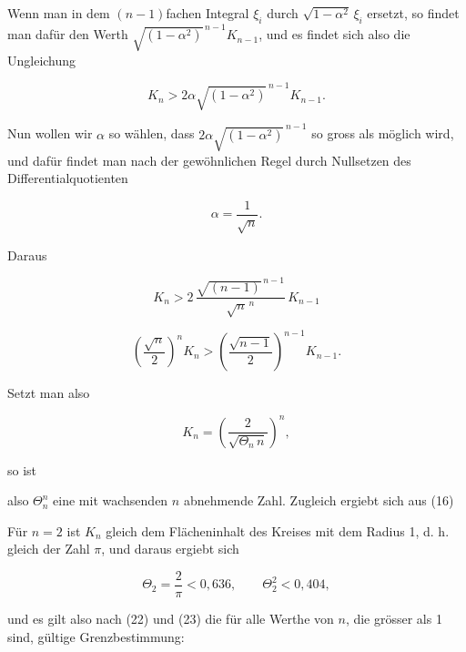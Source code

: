 Wenn man in dem $(n-1)$fachen Integral $\xi_i$ durch
$\sqrt{1-\alpha^2}\,\xi_i$ ersetzt, so findet man dafür den Werth
$\sqrt{(1-\alpha^2)}^{\,n-1} K_{n-1}$, und es findet sich also die
Ungleichung

\[
K_n > 2\alpha \sqrt{(1-\alpha^2)}^{\,n-1} K_{n-1}.
\]

Nun wollen wir $\alpha$ so wählen, dass $2\alpha
\sqrt{(1-\alpha^2)}^{\,n-1}$ so gross als möglich wird, und dafür
findet man nach der gewöhnlichen Regel durch Nullsetzen des
Differentialquotienten

\[
\alpha = \frac{1}{\sqrt{n}}.
\]

Daraus

\[
K_n > 2\, \frac{\sqrt{(n-1)}^{\,n-1}}{\sqrt{n}^{\,n}}\, K_{n-1}
\]

\[
\left(\frac{\sqrt{n}}{2}\right)^{n} K_n > \left(\frac{\sqrt{n-1}}{2}\right)^{n-1} K_{n-1}.
\]

Setzt man also

\[
K_n = \left(\frac{2}{\sqrt{\Theta_n\, n}}\right)^{n},
\]

so ist


also $\Theta_n^n$ eine mit wachsenden $n$ abnehmende Zahl. Zugleich
ergiebt sich aus (16)


Für $n = 2$ ist $K_n$ gleich dem Flächeninhalt des Kreises mit dem
Radius 1, d. h. gleich der  Zahl $\pi$, und
daraus ergiebt sich

\[
\Theta_2 = \frac{2}{\pi} < 0{,}636,\qquad \Theta_2^2 < 0{,}404,
\]

und es gilt also nach (22) und (23) die für alle Werthe von $n$,
die grösser als 1 sind, gültige Grenzbestimmung:


